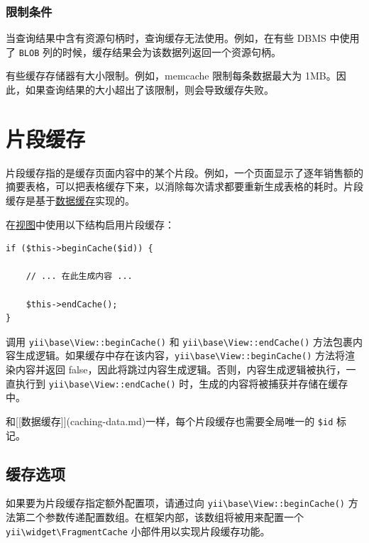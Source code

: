 \subsubsection{限制条件 \label{caching-data.md::query-caching-limitations}}
当查询结果中含有资源句柄时，查询缓存无法使用。例如，在有些 DBMS 中使用了 \lstinline|BLOB| 列的时候，缓存结果会为该数据列返回一个资源句柄。

有些缓存存储器有大小限制。例如，memcache 限制每条数据最大为 1MB。因此，如果查询结果的大小超出了该限制，则会导致缓存失败。



\label{caching-fragment.md}\section{片段缓存}
片段缓存指的是缓存页面内容中的某个片段。例如，一个页面显示了逐年销售额的摘要表格，可以把表格缓存下来，以消除每次请求都要重新生成表格的耗时。片段缓存是基于\hyperref[caching-data.md]{数据缓存}实现的。

在\hyperref[structure-views.md]{视图}中使用以下结构启用片段缓存：

\lstset{language=php}\begin{lstlisting}
if ($this->beginCache($id)) {

    // ... 在此生成内容 ...

    $this->endCache();
}
\end{lstlisting}
调用 \texttt{yii{\allowbreak{}\textbackslash}base{\allowbreak{}\textbackslash}View\allowbreak{}::\allowbreak{}beginCache()} 和 \texttt{yii{\allowbreak{}\textbackslash}base{\allowbreak{}\textbackslash}View\allowbreak{}::\allowbreak{}endCache()} 方法包裹内容生成逻辑。如果缓存中存在该内容，\texttt{yii{\allowbreak{}\textbackslash}base{\allowbreak{}\textbackslash}View\allowbreak{}::\allowbreak{}beginCache()} 方法将渲染内容并返回 false，因此将跳过内容生成逻辑。否则，内容生成逻辑被执行，一直执行到 \texttt{yii{\allowbreak{}\textbackslash}base{\allowbreak{}\textbackslash}View\allowbreak{}::\allowbreak{}endCache()} 时，生成的内容将被捕获并存储在缓存中。

和[[数据缓存]](caching-data.md)一样，每个片段缓存也需要全局唯一的 \lstinline|$id| 标记。

\subsection{缓存选项 \label{caching-fragment.md::caching-options}}
如果要为片段缓存指定额外配置项，请通过向 \texttt{yii{\allowbreak{}\textbackslash}base{\allowbreak{}\textbackslash}View\allowbreak{}::\allowbreak{}beginCache()} 方法第二个参数传递配置数组。在框架内部，该数组将被用来配置一个 \texttt{yii{\allowbreak{}\textbackslash}widget{\allowbreak{}\textbackslash}FragmentCache} 小部件用以实现片段缓存功能。

